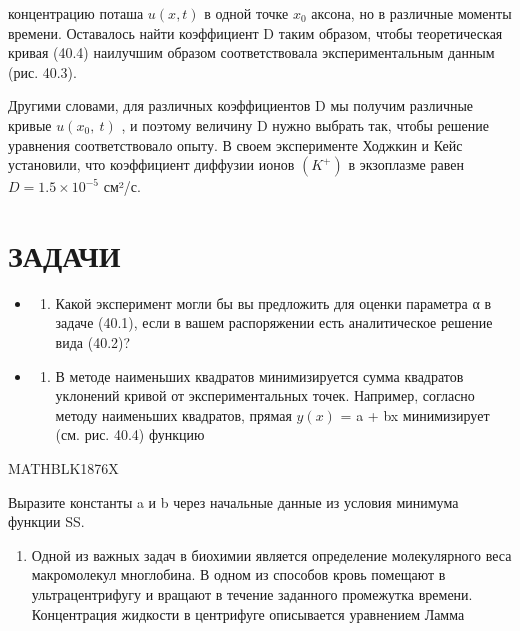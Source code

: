 \documentclass[
]{article}
\providecommand{\tightlist}{%
  \setlength{\itemsep}{0pt}\setlength{\parskip}{0pt}}
\begin{document}
{{{концентрацию поташа \(u(x, t)\) в одной точке \(x_0\) аксона, но в
различные моменты времени. Оставалось найти коэффициент D таким образом,
чтобы теоретическая кривая (40.4) наилучшим образом соответствовала
экспериментальным данным (рис. 40.3).

Другими словами, для различных коэффициентов D мы получим различные
кривые \(u\left(x_{0},\ t\right)\) , и поэтому величину D нужно выбрать
так, чтобы решение уравнения соответствовало опыту. В своем эксперименте
Ходжкин и Кейс установили, что коэффициент диффузии ионов \((K^{+})\) в
экзоплазме равен \(D=1.5\times10^{-5}\) см²/с.

\section{ЗАДАЧИ}\label{ux437ux430ux434ux430ux447ux438-18}

\begin{itemize}
\tightlist
\item
  \begin{enumerate}
  \def\labelenumi{\arabic{enumi}.}
  \tightlist
  \item
    Какой эксперимент могли бы вы предложить для оценки параметра α в
    задаче (40.1), если в вашем распоряжении есть аналитическое решение
    вида (40.2)?
  \end{enumerate}
\item
  \begin{enumerate}
  \def\labelenumi{\arabic{enumi}.}
  \setcounter{enumi}{1}
  \tightlist
  \item
    В методе наименьших квадратов минимизируется сумма квадратов
    уклонений кривой от экспериментальных точек. Например, согласно
    методу наименьших квадратов, прямая \(y(x)\) = a + bx минимизирует
    (см. рис. 40.4) функцию
  \end{enumerate}
\end{itemize}

MATHBLK1876X

Выразите константы a и b через начальные данные из условия минимума
функции SS.

\begin{enumerate}
\def\labelenumi{\arabic{enumi}.}
\setcounter{enumi}{2}
\tightlist
\item
  Одной из важных задач в биохимии является определение молекулярного
  веса макромолекул многлобина. В одном из способов кровь помещают в
  ультрацентрифугу и вращают в течение заданного промежутка времени.
  Концентрация жидкости в центрифуге описывается уравнением Ламма
\end{enumerate}

}}}
\end{document}
